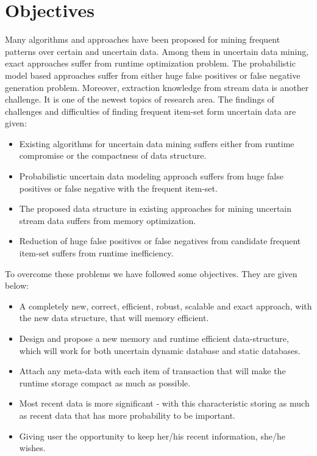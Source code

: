 \section{Objectives}
Many algorithms and approaches have been proposed for mining frequent patterns over certain and uncertain data. Among them in uncertain data mining, exact approaches suffer from runtime optimization problem. The probabilistic model based approaches suffer from either huge false positives or false negative generation problem. Moreover, extraction knowledge from stream data is another challenge. It is one of the newest topics of research area. The findings of challenges and difficulties of finding frequent item-set form uncertain data are given:
\begin{itemize}
    \item Existing algorithms for uncertain data mining suffers either from runtime compromise or the compactness of data structure.
    \item Probabilistic uncertain data modeling approach suffers from huge false positives or false negative with the frequent item-set.
    \item The proposed data structure in existing approaches for mining uncertain stream data suffers from memory optimization.
    \item Reduction of huge false positives or false negatives from candidate frequent item-set suffers from runtime inefficiency.
\end{itemize}
To overcome these problems we have followed some objectives. They are given below:
\begin{itemize}
    \item A completely new, correct, efficient, robust, scalable and exact approach, with the new data structure, that will memory efficient.
    \item Design and propose a new memory and runtime efficient data-structure, which will work for both uncertain dynamic database and static databases.
    \item Attach any meta-data with each item of transaction that will make the runtime storage compact as much as possible.
    \item Most recent data is more significant - with this characteristic storing as much as recent data that has more probability to be important.
   \item Giving user the opportunity to keep her/his recent information, she/he wishes. 
\end{itemize}

